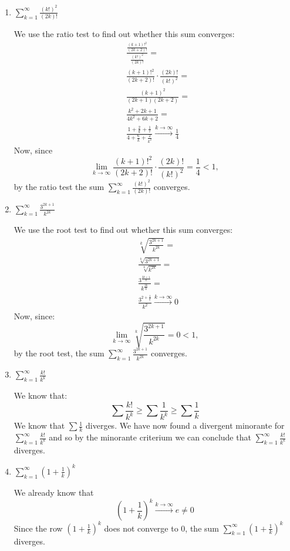 \documentclass[week=6]{homework}
\begin{document}
\begin{questions}
\begin{enumerate}[label=(\alph*)]
	    	\item $\displaystyle \sum_{k=1}^{\infty} \frac{(k!)^2}{(2k)!}$
	    	
		    We use the ratio test to find out whether this sum converges:
		    \begin{align*}
		    	& \frac{\frac{(k+1)!^2}{(2k+2)!}}{\frac{(k!)^2}{(2k)!}} = \\
		    	& \frac{(k+1)!^2}{(2k+2)!} \cdot \frac{(2k)!}{(k!)^2} = \\
		    	& \frac{(k+1)^2}{(2k+1)(2k+2)} = \\
		    	& \frac{k^2 + 2k + 1}{4k^2 + 6k + 2} = \\
		    	& \frac{1 + \frac{2}{k} + \frac{1}{^2}}{4 + \frac{6}{k} + \frac{2}{k^2}} \xrightarrow{k \to \infty} \frac{1}{4}
		    \end{align*}
		    Now, since 
		    \[
		    \lim_{k \to \infty} \frac{(k+1)!^2}{(2k+2)!} \cdot \frac{(2k)!}{(k!)^2} = \frac{1}{4} < 1,
		    \]
		    by the ratio test the sum $\sum_{k=1}^{\infty} \frac{(k!)^2}{(2k)!}$ converges. 
	    	
	    	\addtocounter{enumi}{2}
	    	\item $\displaystyle \sum_{k=1}^{\infty} \frac{3^{2k+1}}{k^{2k}}$
	    	
	    	We use the root test to find out whether this sum converges:
	    	\begin{align*}
	    		& \sqrt[k]{\frac{3^{2k+1}}{k^{2k}}} = \\
	    		& \frac{\sqrt[k]{3^{2k+1}}}{\sqrt[k]{k^{2k}}} = \\
	    		& \frac{3^{\frac{2k+1}{k}}}{k^{\frac{2k}{k}}} = \\
	    		& \frac{3^{2 + \frac{1}{k}}}{k^2} \xrightarrow{k \to \infty} 0
	    	\end{align*}
	    	Now, since:
	    	\[
		    	\lim_{k \to \infty} \sqrt[k]{\frac{3^{2k+1}}{k^{2k}}} = 0 < 1,
	    	\]
	    	by the root test, the sum $ \sum_{k=1}^{\infty} \frac{3^{2k+1}}{k^{2k}}$ converges. 
	    	
	    	\addtocounter{enumi}{1}
	    	\item $\displaystyle \sum_{k=1}^{\infty} \frac{k!}{k^k}$
	    	
	    	We know that:
	    	\[
		    	\sum \frac{k!}{k^k} \ge \sum \frac{1}{k^k} \ge \sum \frac{1}{k}
	    	\]
	    	We know that $\sum \frac{1}{k}$ diverges. We have now found a divergent minorante for $\sum_{k=1}^{\infty} \frac{k!}{k^k}$ and so by the minorante criterium we can conclude that $\sum_{k=1}^{\infty} \frac{k!}{k^k}$ diverges. 
	    	
	    	\addtocounter{enumi}{1}
	    	\item $\displaystyle \sum_{k=1}^{\infty} \left(1 + \frac{1}{k}\right)^k$
	    	
	    	We already know that
	    	\[
		    	\left(1 + \frac{1}{k}\right)^k \xrightarrow{k \to \infty} e \neq 0
	    	\]
	    	Since the row $\left(1 + \frac{1}{k}\right)^k$ does not converge to $0$, the sum $\sum_{k=1}^{\infty} \left(1 + \frac{1}{k}\right)^k$ diverges. 
	    \end{enumerate}
     \end{questions}
\end{document}
